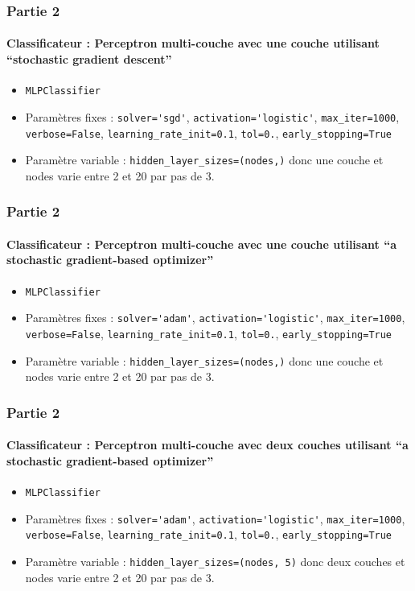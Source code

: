 \documentclass{beamer}
\begin{document}
    \begin{frame}[fragile]
        \frametitle{Partie 2}
        \framesubtitle{Classificateur : Perceptron multi-couche avec une couche utilisant ``stochastic gradient descent''}
        \begin{itemize}
            \item \verb?MLPClassifier?
            \item Paramètres fixes : \verb?solver='sgd'?, \verb?activation='logistic'?, \verb?max_iter=1000?, \verb?verbose=False?, \verb?learning_rate_init=0.1?, \verb?tol=0.?, \verb?early_stopping=True?
        
            \item Paramètre variable : \verb?hidden_layer_sizes=(nodes,)? donc une couche et nodes varie entre 2 et 20 par pas de 3.
        \end{itemize}
    \end{frame}
    
    \begin{frame}[fragile]
        \frametitle{Partie 2}
        \framesubtitle{Classificateur : Perceptron multi-couche avec une couche utilisant ``a stochastic gradient-based optimizer''}
        \begin{itemize}
            \item \verb?MLPClassifier?
            \item Paramètres fixes : \verb?solver='adam'?, \verb?activation='logistic'?, \verb?max_iter=1000?, \verb?verbose=False?, \verb?learning_rate_init=0.1?, \verb?tol=0.?, \verb?early_stopping=True?
        
            \item Paramètre variable : \verb?hidden_layer_sizes=(nodes,)? donc une couche et nodes varie entre 2 et 20 par pas de 3.
        \end{itemize}
    \end{frame}
    
    \begin{frame}[fragile]
        \frametitle{Partie 2}
        \framesubtitle{Classificateur : Perceptron multi-couche avec deux couches utilisant ``a stochastic gradient-based optimizer''}
        \begin{itemize}
            \item \verb?MLPClassifier?
            \item Paramètres fixes : \verb?solver='adam'?, \verb?activation='logistic'?, \verb?max_iter=1000?, \verb?verbose=False?, \verb?learning_rate_init=0.1?, \verb?tol=0.?, \verb?early_stopping=True?
        
            \item Paramètre variable :  \verb?hidden_layer_sizes=(nodes, 5)? donc deux couches et nodes varie entre 2 et 20 par pas de 3.
        \end{itemize}
    \end{frame}
    
\end{document}
